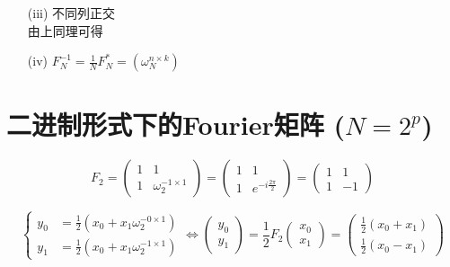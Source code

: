 \documentclass[linespread=1.5,openany]{book}%
\theoremstyle{plain}
\begin{document}
{{{\begin{itemize}
\begin{proof}
							\begin{equation}
								\begin{aligned}
									J^T \overline{J} &= \omega_N^{j \times 0} \overline{\omega_N^{j \times 0}} + \omega_N^{j \times 1} \overline{\omega_N^{j \times 1}} + \cdots + \omega_N^{j(N-1)} \overline{\omega_N^{j(N-1)}} \\[8pt]
									&= 1 + \cdots + 1 = N.
								\end{aligned}
							\end{equation}
						\end{proof}
						\item [(iii)]不同列正交\\
						由上同理可得
						\item [(iv)]$F_N^{-1} = \frac{1}{N} F_N^* = \left( \omega_N^{n\times k} \right)$
					\end{itemize}
					
					
					\section{ 二进制形式下的Fourier矩阵 ($N=2^p$)}
					
					\begin{equation}
						F_2 = \begin{pmatrix} 1 & 1 \\ 1 & \omega_2^{-1 \times 1} \end{pmatrix}
						= \begin{pmatrix} 1 & 1 \\ 1 & e^{-i \frac{2\pi}{2}} \end{pmatrix}
						= \begin{pmatrix} 1 & 1 \\ 1 & -1 \end{pmatrix}
					\end{equation}
					
					\begin{equation}
						\left\{
						\begin{aligned}
							y_0 &= \frac{1}{2}(x_0 + x_1 \omega_2^{-0 \times 1}) \\[8pt]
							y_1 &= \frac{1}{2}(x_0 + x_1 \omega_2^{-1 \times 1})
						\end{aligned}
						\right.
						\Leftrightarrow
						\begin{pmatrix} y_0 \\ y_1 \end{pmatrix}
						= \frac{1}{2} F_2 \begin{pmatrix} x_0 \\ x_1 \end{pmatrix}
						= \begin{pmatrix} \frac{1}{2}(x_0 + x_1) \\ \frac{1}{2}(x_0 - x_1) \end{pmatrix}
					\end{equation}
					
}}}
\end{document}
